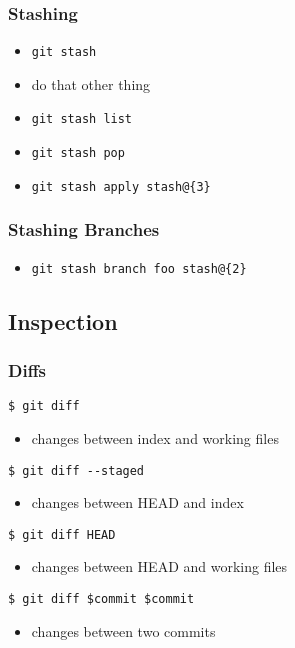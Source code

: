 \documentclass[english]{beamer}
\newcommand{\mysubsection}[2]{%
  \hypertarget{#2}{}%
  \subsection{#1}%
  \label{#2}%
}
\newcommand{\CMD}[1]{%
\texttt{\textcolor{code-blue}{#1}}%
}
\begin{document}
\begin{frame}
\frametitle{Stashing}
\begin{itemize}
        \item \CMD{git stash}
                \vspace{\baselineskip}
        \item do that other thing
                \vspace{\baselineskip}
        \item \CMD{git stash list} \\
        \item \CMD{git stash pop}
        \item \CMD{git stash apply stash@\{3\} }
\end{itemize}
\end{frame}

\begin{frame}
\frametitle{Stashing Branches}
\begin{itemize}
        \item \CMD{git stash branch foo stash@\{2\} }
\end{itemize}
\end{frame}

\mysubsection{Inspection}{using:inspection}
\begin{frame}
\frametitle{Diffs}

\CMD{\$ git diff}
\begin{itemize}
        \item changes between index and working files
\end{itemize}

\pause{}
\vspace{.1\textheight}

\CMD{\$ git diff {-}-staged}
\begin{itemize}
        \item changes between HEAD and index
\end{itemize}

\pause{}
\vspace{.1\textheight}

\CMD{\$ git diff HEAD}
\begin{itemize}
        \item changes between HEAD and working files
\end{itemize}

\pause{}
\vspace{.1\textheight}

\CMD{\$ git diff \$commit \$commit}
\begin{itemize}
        \item changes between two commits
\end{itemize}

\end{frame}
\end{document}
